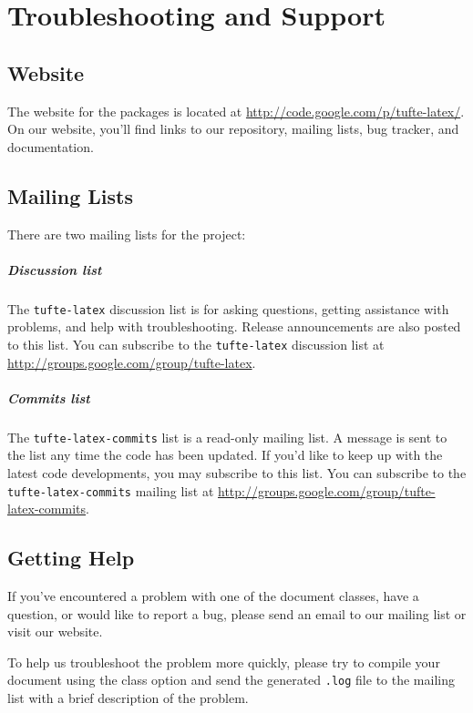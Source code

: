 \chapter{Troubleshooting and Support}
\label{ch:troubleshooting}

\section{\TL Website}\label{sec:website}
The website for the \TL packages is located at
\url{http://code.google.com/p/tufte-latex/}.  On our website, you'll find
links to our  repository, mailing lists, bug tracker, and documentation.

\section{\TL Mailing Lists}\label{sec:mailing-lists}
There are two mailing lists for the \TL project:

\paragraph{Discussion list}
The \texttt{tufte-latex} discussion list is for asking questions, getting
assistance with problems, and help with troubleshooting.  Release announcements
are also posted to this list.  You can subscribe to the \texttt{tufte-latex}
discussion list at \url{http://groups.google.com/group/tufte-latex}.

\paragraph{Commits list}
The \texttt{tufte-latex-commits} list is a read-only mailing list.  A message
is sent to the list any time the \TL code has been updated.  If you'd like to
keep up with the latest code developments, you may subscribe to this list.  You
can subscribe to the \texttt{tufte-latex-commits} mailing list at
\url{http://groups.google.com/group/tufte-latex-commits}.

\section{Getting Help}\label{sec:getting-help}
If you've encountered a problem with one of the \TL document classes, have a
question, or would like to report a bug, please send an email to our
mailing list or visit our website.

To help us troubleshoot the problem more quickly, please try to compile your
document using the  class option and send the generated
\texttt{.log} file to the mailing list with a brief description of the problem.



